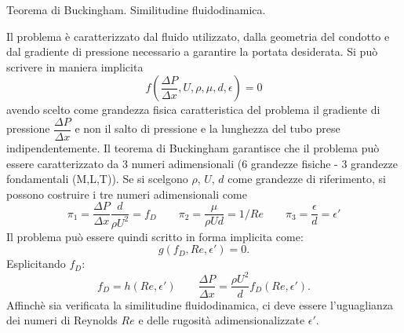\sol

\partone
 Teorema di Buckingham. Similitudine fluidodinamica.

\parttwo
Il problema è caratterizzato dal fluido utilizzato, dalla geometria del
 condotto e dal gradiente di pressione necessario a garantire la portata
 desiderata. Si può scrivere in maniera implicita
 \begin{equation}
  f\left( \dfrac{\Delta P}{\Delta x}, U, \rho, \mu, d, \epsilon \right) = 0
 \end{equation}
 avendo scelto come grandezza fisica caratteristica del problema il
  gradiente di pressione $\dfrac{\Delta P}{\Delta x}$ e non il salto di
  pressione e la lunghezza del tubo prese indipendentemente.
 Il teorema di Buckingham garantisce che il problema può essere
  caratterizzato da 3 numeri adimensionali (6 grandezze fisiche - 3 grandezze
  fondamentali (M,L,T)). Se si scelgono $\rho$, $U$, $d$ come grandezze di
  riferimento, si possono costruire i tre numeri adimensionali come
  \begin{equation}
   \pi_1 = \dfrac{\Delta P}{\Delta x} \dfrac{d}{\rho U^2} = f_D \qquad
   \pi_2 = \dfrac{\mu}{\rho U d} = 1/Re \qquad
   \pi_3 = \dfrac{\epsilon}{d} = \epsilon'
  \label{eqn:pi}
  \end{equation}
 Il problema può essere quindi scritto in forma implicita come:
 \begin{equation}
  g(f_D,Re,\epsilon') = 0.
 \end{equation}
 Esplicitando $f_D$:
 \begin{equation}
  f_D = h(Re,\epsilon') \qquad
  \dfrac{\Delta P}{\Delta x} = \dfrac{\rho U^2}{d} f_D(Re,\epsilon').
 \end{equation}
 Affinchè sia verificata la similitudine fluidodinamica, ci deve essere
 l'uguaglianza dei numeri di Reynolds $Re$ e delle rugosità
 adimensionalizzate $\epsilon'$.
 
